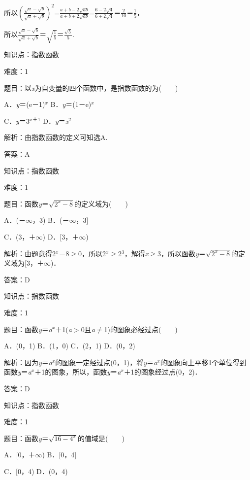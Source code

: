 \documentclass{article} %
\begin{document}
所以$(\frac{\sqrt{a}-\sqrt{b}}{\sqrt{a}+\sqrt{b}})^{2}$=$\frac{a+b-2\sqrt{ab}}{a+b+2\sqrt{ab}}$=$\frac{6-2\sqrt{4}}{6+2\sqrt{4}}$＝$\frac{2}{10}$＝$\frac{1}{5}$，

所以$\frac{\sqrt{a}-\sqrt{b}}{\sqrt{a}+\sqrt{b}}$＝$\sqrt{\frac{1}{5}}$＝$\frac{\sqrt{5}}{5}$.

知识点：指数函数

难度：1

题目：以\textit{x}为自变量的四个函数中，是指数函数的为(　　)

A．\textit{y}＝(e－1)\textit{${}^{x}$}     B．\textit{y}＝(1－e)\textit{${}^{x}$}

C．\textit{y}＝3\textit{${}^{x}$}${}^{\textrm{＋}}$${}^{1}$     D．\textit{y}＝\textit{x}${}^{2}$

解析：由指数函数的定义可知选A.

答案：A

知识点：指数函数

难度：1

题目：函数\textit{y}＝$\sqrt{2^{x}-8}$的定义域为(　　)

A．(－$\mathrm{\infty}$，3)   B．(－$\mathrm{\infty}$，3]

C．(3，＋$\mathrm{\infty}$)   D．[3，＋$\mathrm{\infty}$)

解析：由题意得2\textit{${}^{x}$}－8$\mathrm{\ge}$0，所以2\textit{${}^{x}$}$\mathrm{\ge}$2${}^{3}$，解得\textit{x}$\mathrm{\ge}$3，所以函数\textit{y}＝$\sqrt{2^{x}-8}$的定义域为[3，＋$\mathrm{\infty}$)．

答案：D

知识点：指数函数

难度：1

题目：函数\textit{y}＝\textit{a${}^{x}$}＋1(\textit{a}$\mathrm{>}$0且\textit{a}$\mathrm{\neq}$1)的图象必经过点(　　)

A．(0，1)  B．(1，0)  C．(2，1)  D．(0，2)

解析：因为\textit{y}＝\textit{a${}^{x}$}的图象一定经过点(0，1)，将\textit{y}＝\textit{a${}^{x}$}的图象向上平移1个单位得到函数\textit{y}＝\textit{a${}^{x}$}＋1的图象，所以，函数\textit{y}＝\textit{a${}^{x}$}＋1的图象经过点(0，2)．

答案：D

知识点：指数函数

难度：1

题目：函数\textit{y}＝$\sqrt{16-4^{x}}$的值域是(　　)

A．[0，＋$\mathrm{\infty}$)   B．[0，4]

C．[0，4)   D．(0，4)
\end{document}
